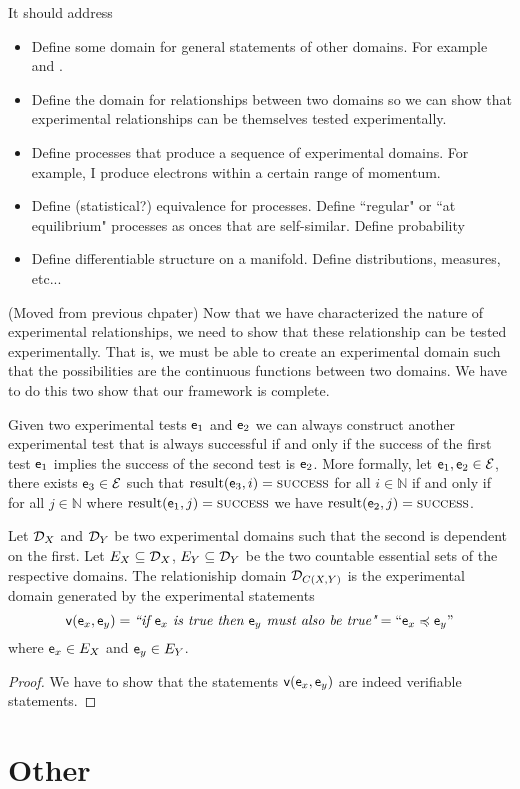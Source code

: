 \documentclass[11pt,letterpaper,fleqn]{memoir} %
\begin{document}
It should address
\begin{itemize}
	\item Define some domain for general statements of other domains. For example  and .
	\item Define the domain for relationships between two domains so we can show that experimental relationships can be themselves tested experimentally.
	\item Define processes that produce a sequence of experimental domains. For example, I produce electrons within a certain range of momentum.
	\item Define (statistical?) equivalence for processes. Define ``regular" or ``at equilibrium" processes as onces that are self-similar. Define probability
	\item Define differentiable structure on a manifold. Define distributions, measures, etc...
\end{itemize}

(Moved from previous chpater) Now that we have characterized the nature of experimental relationships, we need to show that these relationship can be tested experimentally. That is, we must be able to create an experimental domain such that the possibilities are the continuous functions between two domains. We have to do this two show that our framework is complete.

\begin{mathSection}
	\begin{axiom}
		Given two experimental tests $\expt_1$ and $\expt_2$ we can always construct another experimental test that is always successful if and only if the success of the first test $\expt_1$ implies the success of the second test is $\expt_2$. More formally, let $\expt_1, \expt_2 \in \exptSet$, there exists $\expt_3 \in \exptSet$ such that $\result(\expt_3, i) = \SUCCESS$ for all $i \in \mathbb{N}$ if and only if for all $j \in \mathbb{N}$ where $\result(\expt_1, j) = \SUCCESS$ we have $\result(\expt_2, j) = \SUCCESS$.
	\end{axiom}
	\begin{defn}
		Let $\edomain_X$ and $\edomain_Y$ be two experimental domains such that the second is dependent on the first. Let $E_X \subseteq \edomain_X$,  $E_Y \subseteq \edomain_Y$ be the two countable essential sets of the respective domains. The relationiship domain $\edomain_{C(X,Y)}$ is the experimental domain generated by the experimental statements
		$$\obs[v](\obs[e]_x, \obs[e]_y) = \statement{if $\obs[e]_x$ is true then $\obs[e]_y$ must also be true}=``\obs[e]_x \narrower \obs[e]_y"$$
		where $\obs[e]_x \in E_X$ and $ \obs[e]_y \in E_Y$.
	\end{defn}
	\begin{proof}
		We have to show that the statements $\obs[v](\obs[e]_x, \obs[e]_y)$ are indeed verifiable statements.
	\end{proof}
\end{mathSection}

\chapter{Other}


	
\end{document}
